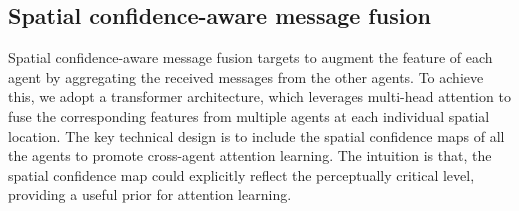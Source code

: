 \documentclass{article}
\begin{document}
\subsection{Spatial confidence-aware message fusion}
\label{sec:Fusion}
\vspace{-2mm}
Spatial confidence-aware message fusion targets to augment the feature of each agent by aggregating the received messages from the other agents. To achieve this, we adopt a transformer architecture, which leverages multi-head attention to fuse the corresponding features from multiple agents at each individual spatial location. The key technical design is to include the spatial confidence maps of all the agents to promote cross-agent attention learning. The intuition is that, the spatial confidence map could explicitly reflect the perceptually critical level, providing a useful prior for attention learning.
\end{document}
